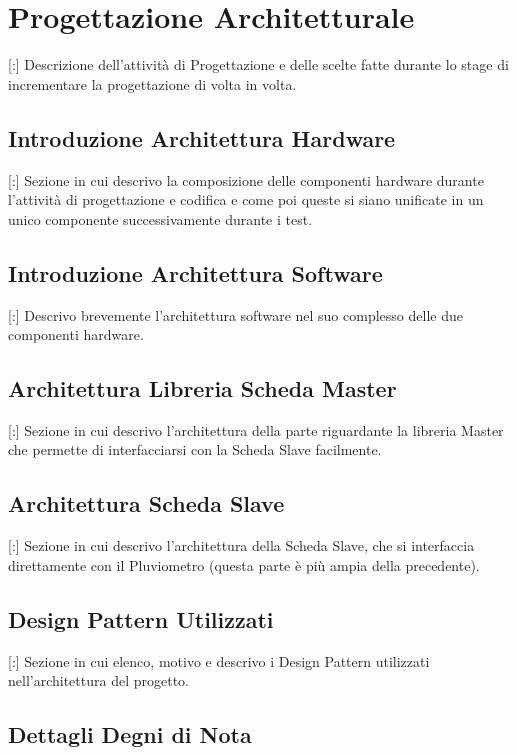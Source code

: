 \documentclass[11pt]{book}              %
\begin{document}
\section{Progettazione Architetturale}

[:] Descrizione dell'attività di Progettazione e delle scelte fatte durante lo stage di incrementare la progettazione di volta in volta.

\subsection{Introduzione Architettura Hardware}

[:] Sezione in cui descrivo la composizione delle componenti hardware durante l'attività di progettazione e codifica e come poi queste si siano unificate in un unico componente successivamente durante i test.

\subsection{Introduzione Architettura Software}

[:] Descrivo brevemente l'architettura software nel suo complesso delle due componenti hardware.

\subsection{Architettura Libreria Scheda Master}

[:] Sezione in cui descrivo l'architettura della parte riguardante la libreria Master che permette di interfacciarsi con la Scheda Slave facilmente. 


\subsection{Architettura Scheda Slave}

[:] Sezione in cui descrivo l'architettura della Scheda Slave, che si interfaccia direttamente con il Pluviometro (questa parte è più ampia della precedente).

\subsection{Design Pattern Utilizzati}

[:] Sezione in cui elenco, motivo e descrivo i Design Pattern utilizzati nell'architettura del progetto.

\subsection{Dettagli Degni di Nota}
\end{document}
